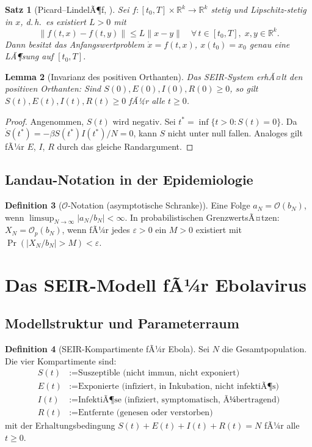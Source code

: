 ﻿\documentclass[12pt,a4paper]{article}
\theoremstyle{definition}
\newtheorem{definition}{Definition}[section]
\theoremstyle{plain}
\newtheorem{satz}[definition]{Satz}
\newtheorem{lemma}[definition]{Lemma}
\theoremstyle{remark}
\newcommand{\RRR}{\mathbb{R}}
\begin{document}
\begin{satz}[Picard--LindelÃ¶f, \cite{coddington1955}]
\label{satz:picard}
Sei $f : [t_0, T] \times \RRR^k \to \RRR^k$ stetig und Lipschitz-stetig in $x$,
d.\,h.\ es existiert $L > 0$ mit
\[
  \|f(t, x) - f(t, y)\| \leq L \|x - y\| \quad \forall\, t \in [t_0, T],\; x,y \in \RRR^k.
\]
Dann besitzt das Anfangswertproblem $\dot{x} = f(t,x)$, $x(t_0) = x_0$
genau eine LÃ¶sung auf $[t_0, T]$.
\end{satz}

\begin{lemma}[Invarianz des positiven Orthanten]
\label{lemma:positiv}
Das SEIR-System erhÃ¤lt den positiven Orthanten: Sind $S(0), E(0), I(0), R(0) \geq 0$,
so gilt $S(t), E(t), I(t), R(t) \geq 0$ fÃ¼r alle $t \geq 0$.
\end{lemma}

\begin{proof}
Angenommen, $S(t)$ wird negativ. Sei $t^* = \inf\{t > 0 : S(t) = 0\}$.
Da $\dot{S}(t^*) = -\beta S(t^*) I(t^*)/N = 0$, kann $S$ nicht unter null fallen.
Analoges gilt fÃ¼r $E$, $I$, $R$ durch das gleiche Randargument.
\end{proof}

\subsection{Landau-Notation in der Epidemiologie}

\begin{definition}[$\mathcal{O}$-Notation (asymptotische Schranke)]
Eine Folge $a_N = \mathcal{O}(b_N)$, wenn $\limsup_{N\to\infty} |a_N/b_N| < \infty$.
In probabilistischen GrenzwertsÃ¤tzen: $X_N = \mathcal{O}_p(b_N)$, wenn fÃ¼r jedes
$\varepsilon > 0$ ein $M > 0$ existiert mit $\Pr(|X_N/b_N| > M) < \varepsilon$.
\end{definition}

\section{Das SEIR-Modell fÃ¼r Ebolavirus}

\subsection{Modellstruktur und Parameterraum}

\begin{definition}[SEIR-Kompartimente fÃ¼r Ebola]
Sei $N$ die Gesamtpopulation. Die vier Kompartimente sind:
\begin{align*}
  S(t) &:= \text{Suszeptible (nicht immun, nicht exponiert)} \\
  E(t) &:= \text{Exponierte (infiziert, in Inkubation, nicht infektiÃ¶s)} \\
  I(t) &:= \text{InfektiÃ¶se (infiziert, symptomatisch, Ã¼bertragend)} \\
  R(t) &:= \text{Entfernte (genesen oder verstorben)}
\end{align*}
mit der Erhaltungsbedingung $S(t) + E(t) + I(t) + R(t) = N$ fÃ¼r alle $t \geq 0$.
\end{definition}
\end{document}
